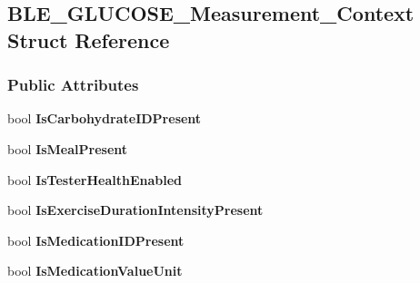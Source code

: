 \hypertarget{struct_b_l_e___g_l_u_c_o_s_e___measurement___context}{}\subsection{B\+L\+E\+\_\+\+G\+L\+U\+C\+O\+S\+E\+\_\+\+Measurement\+\_\+\+Context Struct Reference}
\label{struct_b_l_e___g_l_u_c_o_s_e___measurement___context}
\subsubsection*{Public Attributes}
\begin{DoxyCompactItemize}
\item 
bool {\bfseries Is\+Carbohydrate\+I\+D\+Present}\hypertarget{struct_b_l_e___g_l_u_c_o_s_e___measurement___context_aa5a23fa8ac2e2ce187f04b6dbea10df1}{}\label{struct_b_l_e___g_l_u_c_o_s_e___measurement___context_aa5a23fa8ac2e2ce187f04b6dbea10df1}

\item 
bool {\bfseries Is\+Meal\+Present}\hypertarget{struct_b_l_e___g_l_u_c_o_s_e___measurement___context_accf5ac85429089117346776a39fd4a11}{}\label{struct_b_l_e___g_l_u_c_o_s_e___measurement___context_accf5ac85429089117346776a39fd4a11}

\item 
bool {\bfseries Is\+Tester\+Health\+Enabled}\hypertarget{struct_b_l_e___g_l_u_c_o_s_e___measurement___context_afe8efb0bfec946a508b09df043bbf55b}{}\label{struct_b_l_e___g_l_u_c_o_s_e___measurement___context_afe8efb0bfec946a508b09df043bbf55b}

\item 
bool {\bfseries Is\+Exercise\+Duration\+Intensity\+Present}\hypertarget{struct_b_l_e___g_l_u_c_o_s_e___measurement___context_a2cf7f0f64b800616282ec3133d4a8257}{}\label{struct_b_l_e___g_l_u_c_o_s_e___measurement___context_a2cf7f0f64b800616282ec3133d4a8257}

\item 
bool {\bfseries Is\+Medication\+I\+D\+Present}\hypertarget{struct_b_l_e___g_l_u_c_o_s_e___measurement___context_a98c169cd554f5aad50b61248fe25b386}{}\label{struct_b_l_e___g_l_u_c_o_s_e___measurement___context_a98c169cd554f5aad50b61248fe25b386}

\item 
bool {\bfseries Is\+Medication\+Value\+Unit}\hypertarget{struct_b_l_e___g_l_u_c_o_s_e___measurement___context_a5485bd2183dfbb9e1b78889f65684d0a}{}\label{struct_b_l_e___g_l_u_c_o_s_e___measurement___context_a5485bd2183dfbb9e1b78889f65684d0a}


\end{DoxyCompactItemize}
